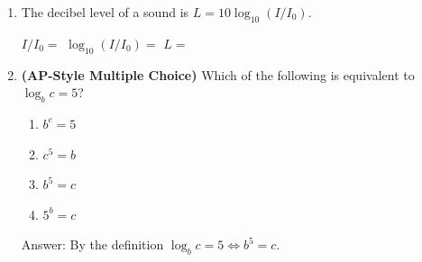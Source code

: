 \documentclass[10pt]{article}
\begin{document}
\begin{enumerate}[itemsep=14pt]
      \vspace{0.06in}
      (b) $\log_3 50$: between  and 
            \hspace{0.5em} because $3^{\ans{3}} < 50 < 3^{\ans{4}}$

      \vspace{0.06in}
      (c) $\log_{10} 500$: between  and 
            \hspace{0.5em} because $10^{\ans{2}} < 500 < 10^{\ans{3}}$

\item The decibel level of a sound is $L = 10\log_{10}(I / I_0)$.

      \vspace{0.06in}
      $I / I_0 = $  \qquad
      $\log_{10}(I / I_0) = $  \qquad
      $L = $ 

\item \textbf{(AP-Style Multiple Choice)} Which of the following is equivalent to $\log_b c = 5$?

      \medskip
      \begin{enumerate}[label=(\Alph*), itemsep=4pt]
        \item $b^c = 5$
        \item $c^5 = b$
        \item $b^5 = c$
        \item $5^b = c$
      \end{enumerate}

      \vspace{0.04in}
      Answer:  \quad By the definition $\log_b c = 5 \Leftrightarrow b^5 = c$.

\end{enumerate}
\end{document}
